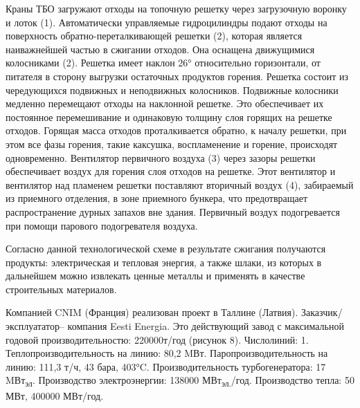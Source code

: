 \begin{multicols}{2}
Краны ТБО загружают отходы на топочную решетку через загрузочную воронку
и лоток (1). Автоматически управляемые гидроцилиндры подают отходы на
поверхность обратно-переталкивающей решетки (2), которая является
наиважнейшей частью в сжигании отходов. Она оснащена движущимися
колосниками (2). Решетка имеет наклон 26° относительно горизонтали, от
питателя в сторону выгрузки остаточных продуктов горения. Решетка
состоит из чередующихся подвижных и неподвижных колосников. Подвижные
колосники медленно перемещают отходы на наклонной решетке. Это
обеспечивает их постоянное перемешивание и одинаковую толщину слоя
горящих на решетке отходов. Горящая масса отходов проталкивается
обратно, к началу решетки, при этом все фазы горения, такие каксушка,
воспламенение и горение, происходят одновременно. Вентилятор первичного
воздуха (3) через зазоры решетки обеспечивает воздух для горения слоя
отходов на решетке. Этот вентилятор и вентилятор над пламенем решетки
поставляют вторичный воздух (4), забираемый из приемного отделения, в
зоне приемного бункера, что предотвращает распространение дурных запахов
вне здания. Первичный воздух подогревается при помощи парового
подогревателя воздуха.

Согласно данной технологической схеме в результате сжигания получаются
продукты: электрическая и тепловая энергия, а также шлаки, из которых в
дальнейшем можно извлекать ценные металлы и применять в качестве
строительных материалов.

Компанией CNIM (Франция) реализован проект в Таллине (Латвия).
Заказчик/эксплуататор-- компания Eesti Energia. Это действующий завод с
максимальной годовой производительностю: 220000т/год (рисунок 8).
Числолиний: 1. Теплопроизводительность на линию: 80,2 MВт.
Паропроизводительность на линию: 111,3 т/ч, 43 бара, 403°C.
Производительность турбогенератора: 17 MВт\textsubscript{эл}.
Производство электроэнергии: 138000 МВт\textsubscript{эл.}/год.
Производство тепла: 50 МВт, 400000 МВт/год.
\end{multicols}

